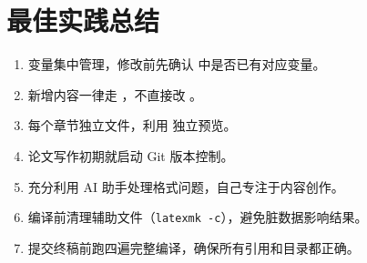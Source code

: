 \documentclass[../main-manual.tex]{subfiles}
\begin{document}
\section{最佳实践总结}

\begin{tcolorbox}[
	colback=green!3!white,
	colframe=green!40!white,
	title={\centering 学位论文排版最佳实践}
]
\begin{enumerate}[label=\textbf{\ding{51}}]
	\item 变量集中管理，修改前先确认  中是否已有对应变量。
	\item 新增内容一律走 ，不直接改 。
	\item 每个章节独立文件，利用  独立预览。
	\item 论文写作初期就启动 Git 版本控制。
	\item 充分利用 AI 助手处理格式问题，自己专注于内容创作。
	\item 编译前清理辅助文件（\texttt{latexmk -c}），避免脏数据影响结果。
	\item 提交终稿前跑四遍完整编译，确保所有引用和目录都正确。
\end{enumerate}
\end{tcolorbox}
\end{document}
